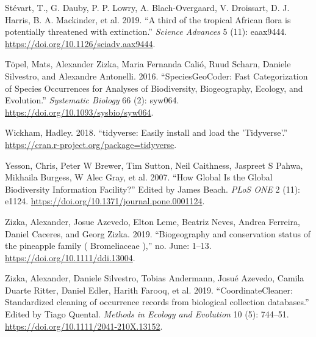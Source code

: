 \documentclass[fleqn,10pt,lineno]{wlpeerj} %
\begin{document}
\leavevmode\hypertarget{ref-Stevart2019}{}%
Stévart, T., G. Dauby, P. P. Lowry, A. Blach-Overgaard, V. Droissart, D. J. Harris, B. A. Mackinder, et al. 2019. ``A third of the tropical African flora is potentially threatened with extinction.'' \emph{Science Advances} 5 (11): eaax9444. \url{https://doi.org/10.1126/sciadv.aax9444}.

\leavevmode\hypertarget{ref-Topel2016}{}%
Töpel, Mats, Alexander Zizka, Maria Fernanda Calió, Ruud Scharn, Daniele Silvestro, and Alexandre Antonelli. 2016. ``SpeciesGeoCoder: Fast Categorization of Species Occurrences for Analyses of Biodiversity, Biogeography, Ecology, and Evolution.'' \emph{Systematic Biology} 66 (2): syw064. \url{https://doi.org/10.1093/sysbio/syw064}.

\leavevmode\hypertarget{ref-Wickham2018}{}%
Wickham, Hadley. 2018. ``tidyverse: Easily install and load the 'Tidyverse'.'' \url{https://cran.r-project.org/package=tidyverse}.

\leavevmode\hypertarget{ref-Yesson2007}{}%
Yesson, Chris, Peter W Brewer, Tim Sutton, Neil Caithness, Jaspreet S Pahwa, Mikhaila Burgess, W Alec Gray, et al. 2007. ``How Global Is the Global Biodiversity Information Facility?'' Edited by James Beach. \emph{PLoS ONE} 2 (11): e1124. \url{https://doi.org/10.1371/journal.pone.0001124}.

\leavevmode\hypertarget{ref-Zizka2019a}{}%
Zizka, Alexander, Josue Azevedo, Elton Leme, Beatriz Neves, Andrea Ferreira, Daniel Caceres, and Georg Zizka. 2019. ``Biogeography and conservation status of the pineapple family ( Bromeliaceae ),'' no. June: 1--13. \url{https://doi.org/10.1111/ddi.13004}.

\leavevmode\hypertarget{ref-Zizka2019}{}%
Zizka, Alexander, Daniele Silvestro, Tobias Andermann, Josué Azevedo, Camila Duarte Ritter, Daniel Edler, Harith Farooq, et al. 2019. ``CoordinateCleaner: Standardized cleaning of occurrence records from biological collection databases.'' Edited by Tiago Quental. \emph{Methods in Ecology and Evolution} 10 (5): 744--51. \url{https://doi.org/10.1111/2041-210X.13152}.
\end{document}
